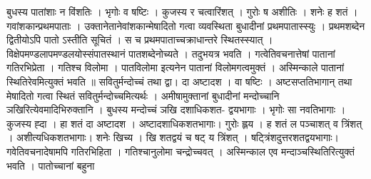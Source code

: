 \documentclass[12pt,a4paper]{report}
\begin{document}
बुधस्य पातांशाः न विंशतिः । भृगोः व षष्टिः । कुजस्य र चत्वारिंशत् । गुरोः ष अशीतिः । शनेः ह शतं । गवांशकान्प्रथमपाताः । उक्तानेतानेवांशकान्मेषादितो गत्वा व्यवस्थिता बुधादीनां प्रथमपातास्स्युः । प्रथमशब्देन द्वितीयोऽपि पातो ऽस्तीति सूचितं । स च प्रथमपाताच्चक्राधान्तरे स्थितस्स्यात् । विक्षेपमण्डलापमण्डलयोस्संपातस्थानं पातशब्देनोच्यते । तदुभयत्र भवति । गत्वेतिवचनात्तेषां पातानां गतिरभिप्रेता । गतिश्च विलोमा । पातविलोमा इत्यनेन पातानां विलोमगत्वमुक्तं । अस्मिन्काले पातानां स्थितिरेवमित्युक्तं भवति ॥ सवितुर्मन्दोच्चं तथा द्वा। दा अष्टादश । वा षष्टिः । अष्टसप्ततिभागान् तथा मेषादितो गत्वा स्थितं सवितुर्मन्दोच्चमित्यर्थः । अमीषामुक्तानां बुधादीनां मन्दोच्चानि ञखिरित्येवमादिभिरुक्तानि । बुधस्य मन्दोच्चं ञखि दशाधिकशत- द्वयभागाः । भृगोः सा नवतिभागाः । कुजस्य ह्दा । हा शतं दा अष्टादश । अष्टादशाधिकशतभागाः। गुरोः ह्लय । ह शतं ल पञ्चाशत् व त्रिंशत् । अशीत्यधिकशतभागाः। शनेः खिच्य । खि शतद्वयं च षट् य त्रिंशत् । षट्त्रिंशदुत्तरशतद्वयभागाः। गवेतिवचनादेषामपि गतिरभिहिता । गतिश्चानुलोमा चन्द्रोच्चवत् । अस्मिन्काल एव मन्दाञ्चस्थितिरित्युक्तं भवति । पातोच्चानां बहुना
\end{document}
